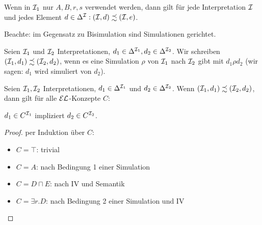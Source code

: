 \begin{tafel}
\begin{center}
    \end{center}
    Wenn in $\mathcal{I}_1$ nur $A, B, r, s$ verwendet werden, dann gilt für jede Interpretation $\mathcal{I}$ und jedes Element $d \in \Delta^{\mathcal{I}}: (\mathcal{I}, d) \precsim (\mathcal{I}, e)$.
\end{tafel}

Beachte: im Gegensatz zu Bisimulation sind Simulationen gerichtet.

Seien $\mathcal{I}_1$ und $\mathcal{I}_2$ Interpretationen, $d_1 \in \Delta^{\mathcal{I}_1}, d_2 \in  \Delta^{\mathcal{I}_2}$. Wir schreiben  $(\mathcal{I}_1,d_1) \precsim (\mathcal{I}_2,d_2)$, wenn es eine Simulation $\rho$ von $\mathcal{I}_1$ nach $\mathcal{I}_2$ gibt mit $d_1 \rho d_2$ (wir sagen: $d_1$ wird simuliert von $d_2$).

\begin{theorem}\label{thm:63}
Seien $\mathcal{I}_1,\mathcal{I}_2$ Interpretationen, $d_1 \in \Delta^{\mathcal{I}_1}$ und
$d_2 \in \Delta^{\mathcal{I}_2}$. Wenn
$(\mathcal{I}_1,d_1) \precsim (\mathcal{I}_2,d_2)$, dann
gilt für alle $\mathcal{E}\mathcal{L}$-Konzepte $C$:
\begin{center}
$d_1 \in C^{\mathcal{I}_1}$ impliziert $d_2 \in C^{\mathcal{I}_2}$.
\end{center}
\end{theorem}
\begin{tafel}
    \begin{proof}
    per Induktion über $C$:
    \begin{itemize}
        \item $C=\top$: trivial
        \item $C=A$: nach Bedingung 1 einer Simulation
        \item $C=D\sqcap E$: nach IV und Semantik
        \item $C=\exists r.D$: nach Bedingung 2 einer Simulation und IV
    \end{itemize}
\end{proof}
\end{tafel}


